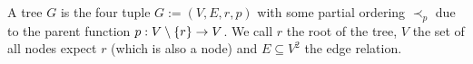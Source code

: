 \documentclass[../main.tex]{subfiles}
\begin{document}
\begin{definition}[Tree]
	A tree \(G\) is the four tuple \(G := (V,E,r,p)\) with some partial ordering \(\prec_{p}\) due to the parent function \(p : V \setminus \left\{ r \right\} \to V\). We call \(r\) the root of the tree, \(V\) the set of all nodes expect \(r\) (which is also a node) and \(E \subseteq V^{2}\) the edge relation.
\end{definition}


\end{document}
